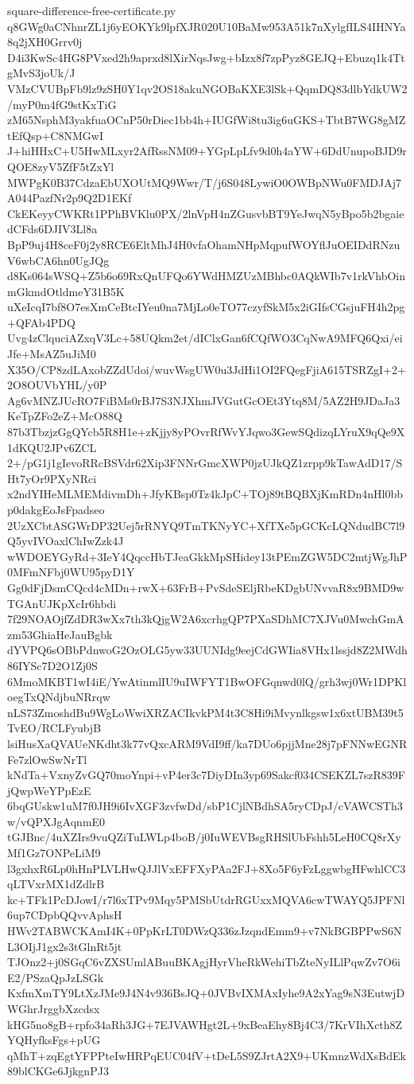 \documentclass[11pt]{article}
\theoremstyle{definition}
\theoremstyle{remark}
\begin{document}
\begin{filecontents*}[overwrite]{square-difference-free-certificate.py}
q8GWg0aCNhnrZL1j6yEOKYk9lpfXJR020U10BaMw953A51k7nXylgfILS4IHNYa8q2jXH0Grrv0j
D4i3KwSc4HG8PVxed2h9aprxd8lXirNqsJwg+bIzx8f7zpPyz8GEJQ+Ebuzq1k4TtgMvS3joUk/J
VMzCVUBpFb9lz9zSH0Y1qv2OS18akuNGOBaKXE3lSk+QqmDQ83dlbYdkUW2/myP0m4fG9stKxTiG
zM65NsphM3yakfuaOCnP50rDiec1bb4h+IUGfWi8tu3ig6uGKS+TbtB7WG8gMZtEfQsp+C8NMGwI
J+hiHHxC+U5HwMLxyr2AfRssNM09+YGpLpLfv9d0h4aYW+6DdUnupoBJD9rQOE8zyV5ZfF5tZxYl
MWPgK0B37CdzaEbUXOUtMQ9Wwr/T/j6S048LywiO0OWBpNWu0FMDJAj7A044PazfNr2p9Q2D1EKf
CkEKeyyCWKRt1PPhBVKlu0PX/2lnVpH4nZGusvbBT9YeJwqN5yBpo5b2bgaiedCFds6DJIV3Ll8a
BpP9uj4H8ceF0j2y8RCE6EltMhJ4H0vfaOhamNHpMqpufWOYflJuOEIDdRNzuV6wbCA6hn0UgJQg
d8Ks064sWSQ+Z5b6o69RxQnUFQo6YWdHMZUzMBhbc0AQkWIb7v1rkVhbOinmGkmdOtldmeY31B5K
uXeIcqI7bf8O7esXmCeBtcIYeu0na7MjLo0eTO77czyfSkM5x2iGIfsCGsjuFH4h2pg+QFAb4PDQ
Uvg4zClquciAZxqV3Lc+58UQkm2et/dIClxGan6fCQfWO3CqNwA9MFQ6Qxi/eiJfe+MsAZ5uJiM0
X35O/CP8zdLAxobZZdUdoi/wuvWsgUW0u3JdHi1OI2FQegFjiA615TSRZgI+2+2O8OUVbYHL/y0P
Ag6vMNZJUcRO7FiBMs0rBJ7S3NJXhmJVGutGcOEt3Ytq8M/5AZ2H9JDaJa3KeTpZFo2eZ+McO88Q
87b3TbzjzGgQYcb5R8H1e+zKjjy8yPOvrRfWvYJqwo3GewSQdizqLYruX9qQe9X1dKQU2JPv6ZCL
2+/pG1j1gIevoRRcBSVdr62Xip3FNNrGmcXWP0jzUJkQZ1zrpp9kTawAdD17/SHt7yOr9PXyNRci
x2ndYIHeMLMEMdivmDh+JfyKBsp0Tz4kJpC+TOj89tBQBXjKmRDn4nHl0bbp0dakgEoJsFpadseo
2UzXCbtASGWrDP32Uej5rRNYQ9TmTKNyYC+XfTXe5pGCKcLQNdudBC7l9Q5yvIVOaxlChIwZzk4J
wWDOEYGyRd+3IeY4QqccHbTJeaGkkMpSHidey13tPEmZGW5DC2mtjWgJhP0MFmNFbj0WU95pyD1Y
Gg0dFjDsmCQcd4cMDn+rwX+63FrB+PvSdeSEljRbeKDgbUNvvaR8x9BMD9wTGAnUJKpXcIr6hbdi
7f29NOAOjfZdDR3wXx7th3kQjgW2A6xcrhgQP7PXaSDhMC7XJVu0MwchGmAzm53GhiaHeJauBgbk
dYVPQ6sOBbPdnwoG2OzOLG5yw33UUNIdg9eejCdGWIia8VHx1lssjd8Z2MWdh86IYSc7D2O1Zj0S
6MmoMKBT1wI4iE/YwAtinmlIU9uIWFYT1BwOFGqnwd0lQ/grh3wj0Wr1DPKloegTxQNdjbuNRrqw
nLS73ZmoshdBu9WgLoWwiXRZACIkvkPM4t3C8Hi9iMvynlkgsw1x6xtUBM39t5TvEO/RCLFyubjB
lsiHusXaQVAUeNKdht3k77vQxcARM9VdI9ff/ka7DUo6pjjMne28j7pFNNwEGNRFe7zlOwSwNrTl
kNdTa+VxnyZvGQ70moYnpi+vP4er3c7DiyDIn3yp69Sakcf034CSEKZL7szR839FjQwpWeYPpEzE
6bqGUskw1uM7f0JH9i6IvXGF3zvfwDd/sbP1CjlNBdhSA5ryCDpJ/cVAWCSTh3w/vQPXJgAqnmE0
tGJBnc/4uXZIrs9vuQZiTuLWLp4boB/j0IuWEVBsgRHSlUbFshh5LeH0CQ8rXyMf1Gz7ONPeLiM9
l3gxhxR6Lp0hHnPLVLHwQJJlVxEFFXyPAa2FJ+8Xo5F6yFzLggwbgHFwhlCC3qLTVxrMX1dZdlrB
kc+TFk1PcDJowI/r7l6xTPv9Mqy5PMSbUtdrRGUxxMQVA6cwTWAYQ5JPFNl6up7CDpbQQvvAphsH
HWv2TABWCKAmI4K+0PpKrLT0DWzQ336zJzqndEmm9+v7NkBGBPPwS6NL3OIjJ1gx2s3tGlnRt5jt
TJOnz2+j0SGqC6vZXSUmlABuuBKAgjHyrVheRkWehiTbZteNyILlPqwZv7O6iE2/PSzaQpJzLSGk
KxfmXmTY9LtXzJMe9J4N4v936BsJQ+0JVBvIXMAxIyhe9A2xYag9sN3EutwjDWGhrJrggbXzcdsx
kHG5no8gB+rpfo34aRh3JG+7EJVAWHgt2L+9xBeaEhy8Bj4C3/7KrVIhXcth8ZYQHyfksFgs+pUG
qMhT+zqEgtYFPPteIwHRPqEUC04fV+tDeL5S9ZJrtA2X9+UKmnzWdXsBdEk89blCKGe6JjkgnPJ3

\end{filecontents*}
\end{document}

